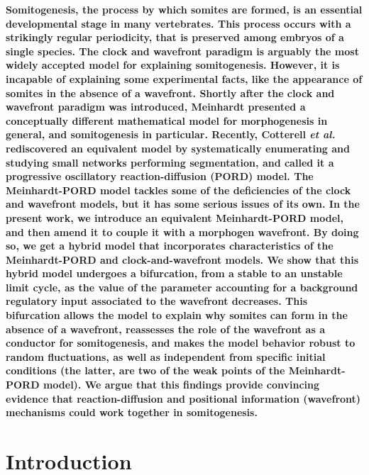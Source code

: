 \documentclass[%
 preprint,
 aip, 
 amsmath,amssymb,
]{revtex4-2}
\begin{document}
\maketitle

\textbf{
Somitogenesis, the process by which somites are formed, is an essential developmental stage in many vertebrates. This process occurs with a strikingly regular periodicity, that is preserved among embryos of a single species. The clock and wavefront paradigm is arguably the most widely accepted model for explaining somitogenesis. However, it is incapable of explaining some experimental facts, like the appearance of somites in the absence of a wavefront. Shortly after the clock and wavefront paradigm was introduced, Meinhardt presented a conceptually different mathematical model for morphogenesis in general, and somitogenesis in particular. Recently, Cotterell \emph{et al.} rediscovered an equivalent model by systematically enumerating and studying small networks performing segmentation, and called it a progressive oscillatory reaction-diffusion (PORD) model. The Meinhardt-PORD model tackles some of the deficiencies of the clock and wavefront models, but it has some serious issues of its own. In the present work, we introduce an equivalent Meinhardt-PORD model, and then amend it to couple it with a morphogen wavefront. By doing so, we get a hybrid model that incorporates characteristics of the Meinhardt-PORD and clock-and-wavefront models. We show that this hybrid model undergoes a bifurcation, from a stable to an unstable limit cycle, as the value of the parameter accounting for a background regulatory input associated to the wavefront decreases. This bifurcation allows the model to explain why somites can form in the absence of a wavefront, reassesses the role of the wavefront as a conductor for somitogenesis, and makes the model behavior robust to random fluctuations, as  well as independent from specific initial conditions (the latter, are two of the weak points of the Meinhardt-PORD model). We argue that this findings provide convincing evidence that reaction-diffusion and positional information (wavefront) mechanisms could work together in somitogenesis.	
}

\section{Introduction}
\label{intro}
\end{document}
